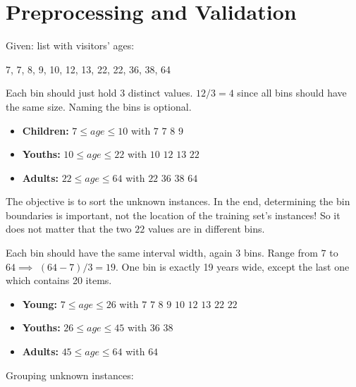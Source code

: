 
\section{Preprocessing and Validation}

\begin{breakbox}

Given: list with visitors' ages:

\begin{center}
7, 7, 8, 9, 10, 12, 13, 22, 22, 36, 38, 64
\end{center}

\begin{breakbox}
Each bin should just hold 3 distinct values. $12/3=4$ since all bins should have the same size. Naming the bins is optional.

\begin{itemize}
	\item \textbf{Children:} $7 \leq age \le 10$ with $7$ $7$ $8$ $9$
	\item \textbf{Youths:} $10 \leq age \le 22$ with $10$ $12$ $13$ $22$
	\item \textbf{Adults:} $22 \leq age \leq 64$ with $22$ $36$ $38$ $64$
\end{itemize}

The objective is to sort the unknown instances. In the end, determining the bin boundaries is important, not the location of the training set's instances! So it does not matter that the two $22$ values are in different bins.

\end{breakbox}

\begin{breakbox}
Each bin should have the same interval width, again 3 bins.  Range from $7$ to $64 \implies$ $(64-7)/3=19$. One bin is exactly 19 years wide, except the last one which contains 20 items.

\begin{itemize}
	\item \textbf{Young:} $7 \leq age \le 26$ with $7$ $7$ $8$ $9$ $10$ $12$ $13$ $22$ $22$
	\item \textbf{Youths:} $26 \leq age \le 45$ with $36$ $38$
	\item \textbf{Adults:} $45 \leq age \leq 64$ with $64$	
\end{itemize}
\end{breakbox}

Grouping unknown instances:


\end{breakbox}
